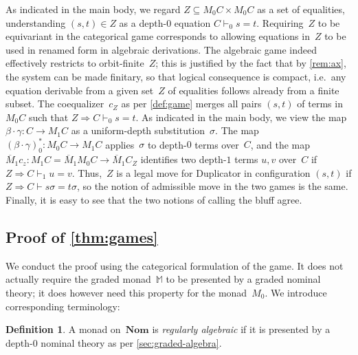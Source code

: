 \documentclass[a4paper,UKenglish,cleveref,thm-restate,numberwithinsect,final]{lipics-v2021}
\newcommand{\centails}{\Rightarrow}
\newcommand{\mbar}{\overline{M}_1}
\theoremstyle{plain}
\numberwithin{equation}{section}
\newcommand{\monad}{{\mathbb{M}}}
\newcommand{\+}[1]{\mathcal{#1}\xspace}
\newcommand{\Nom}{\mathbf{Nom}}
\theoremstyle{definition}
\newtheorem{defn}[theorem]{Definition}
\begin{document}
As indicated in the main body, we regard $Z\subseteq M_0C\times M_0C$
as a set of equalities, understanding $(s,t)\in Z$ as a depth-$0$
equation $C\vdash_0s=t$. Requiring~$Z$ to be equivariant in the
categorical game corresponds to allowing equations in~$Z$ to be used
in renamed form in algebraic derivations. The algebraic game indeed
effectively restricts to orbit-finite~$Z$; this is justified by the
fact that by \cref{rem:ax}, the system can be made finitary, so that
logical consequence is compact, i.e.~any equation derivable from a
given set~$Z$ of equalities follows already from a finite subset. The
coequalizer~$c_Z$ as per \cref{def:game} merges all pairs $(s,t)$ of
terms in $M_0C$ such that $Z\centails C\vdash_0 s=t$. As indicated in
the main body, we view the map $\beta\cdot\gamma\colon C\to M_1C$ as a
uniform-depth substitution~$\sigma$. The map
$(\beta\cdot\gamma)^*_0\colon M_0C\to M_1 C$ applies~$\sigma$ to
depth-$0$ terms over~$C$, and the map
$\mbar c_z\colon M_1C=\mbar M_0C\to\mbar C_Z$ identifies two depth-$1$
terms $u,v$ over~$C$ if $Z\centails C\vdash_1 u=v$. Thus,~$Z$ is a
legal move for Duplicator in configuration $(s,t)$ if
$Z\centails C\vdash s\sigma=t\sigma$, so the notion of admissible move
in the two games is the same. Finally, it is easy to see that the two
notions of calling the bluff agree.


\subsection*{Proof of  \cref{thm:games}}

We conduct the proof using the categorical formulation of the game. It
does not actually require the graded monad~$\monad$ to be presented by
a graded nominal theory; it does however need this property for the
monad~$M_0$. We introduce corresponding terminology:
\begin{defn}
  A monad on~$\Nom$ is \emph{regularly algebraic} if it is presented
  by a depth-$0$ nominal theory as per \cref{sec:graded-algebra}.
\end{defn}
\end{document}
